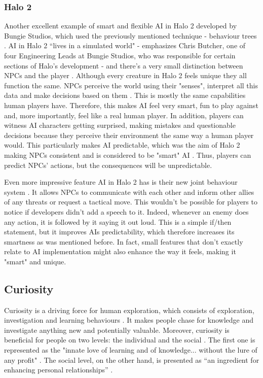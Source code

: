 \documentclass[journal]{IEEEtran}
\begin{document}
\subsubsection{Halo 2} %
Another excellent example of smart and flexible AI in Halo 2 developed by Bungie Studios, which used the previously mentioned technique - behaviour trees \cite{behaviourtreeofhalo2}. AI in Halo 2 ``lives in a simulated world" \cite{halo2} - emphasizes Chris Butcher, one of four Engineering Leads at Bungie Studios, who was responsible for certain sections of Halo's development - and there's a very small distinction between NPCs and the player \cite{halo2}. Although every creature in Halo 2 feels unique they all function the same. NPCs perceive the world using their "senses", interpret all this data and make decisions based on them \cite{halo2}. This is mostly the same capabilities human players have. Therefore, this makes AI feel very smart, fun to play against and, more importantly, feel like a real human player. In addition, players can witness AI characters getting surprised, making mistakes and questionable decisions \cite{halo2} because they perceive their environment the same way a human player would. This particularly makes AI predictable, which was the aim of Halo 2 making NPCs consistent \cite{halo2} and is considered to be "smart" AI \cite{gamemakertoolkit}. Thus, players can predict NPCs' actions, but the consequences will be unpredictable.

Even more impressive feature AI in Halo 2 has is their new joint behaviour system \cite{halo2}. It allows NPCs to communicate with each other and inform other allies of any threats or request a tactical move. This wouldn't be possible for players to notice if developers didn't add a speech to it. Indeed, whenever an enemy does any action, it is followed by it saying it out loud. This is a simple if/then statement, but it improves AIs predictability, which therefore increases its smartness as was mentioned before. In fact, small features that don't exactly relate to AI implementation might also enhance the way it feels, making it "smart" and unique.

\subsection{Curiosity} %
Curiosity is a driving force for human exploration, which consists of exploration, investigation and learning behaviours \cite{wu2013curiosity}\cite{kashdan2004curiosity}. It makes people chase for knowledge and investigate anything new and potentially valuable. Moreover, curiosity is beneficial for people on two levels: the individual and the social \cite{kashdan2010curiosity}. The first one is represented as the "innate love of learning and of knowledge... without the lure of any profit" \cite{loewenstein1994psychology}. The social level, on the other hand, is presented as ``an ingredient for enhancing personal relationships'' \cite{wu2013curiosity}.
\end{document}

